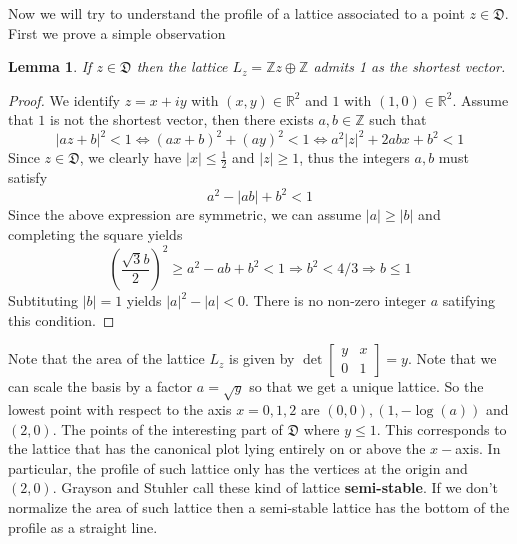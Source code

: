 \documentclass[12pt]{article} %
\newtheorem{lemma}[definition]{Lemma}
\begin{document}
Now we will try to understand the profile of a lattice associated to a point $z \in \mathfrak{D}$. First we
prove a simple observation
\begin{lemma}
  If $z \in \mathfrak{D}$ then the lattice $L_z = \mathbb{Z}z\oplus \mathbb{Z}$ admits 1 as the shortest vector.
\end{lemma}
\begin{proof}
  We identify $z = x+iy$ with $(x,y) \in \mathbb{R}^2$ and $1$ with $(1,0) \in \mathbb{R}^2$.
  Assume that $1$ is not the shortest vector, then there exists $a,b \in \mathbb{Z}$ such that
  \[ |az+b|^2 < 1 \Leftrightarrow (ax+b)^2+(ay)^2 < 1\Leftrightarrow a^2|z|^2+2abx+b^2< 1\]
  Since $z \in \mathfrak{D}$, we clearly have $|x| \le \frac{1}{2}$ and $|z| \ge 1$,  thus the integers $a,b$ must
  satisfy
  \[ a^2 -|ab|+b^2 < 1\]
  Since the above expression are symmetric, we can assume $|a| \ge |b|$ and completing the square yields
  \[\left(\dfrac{\sqrt{3}b}{2}\right)^2 \ge a^2-ab+b^2 <1 \Rightarrow b^2<4/3 \Rightarrow b \le 1\]
  Subtituting $|b|=1$ yields $|a|^2-|a|<0$. There is no non-zero integer $a$ satifying this condition.
\end{proof}
Note that the area of the lattice $L_z$ is given by $\det\begin{bmatrix}
    y & x \\
    0 & 1
  \end{bmatrix} = y$. Note that we can scale the basis by a factor $a=\sqrt{y}$ so that we get a unique lattice.
So the lowest point with respect to the axis $x = 0,1,2$ are $(0,0), (1,-\log(a))$ and $(2,0)$.
The points of the interesting part of $\mathfrak{D}$ where $y\le 1$. This corresponds to the lattice
that has the canonical plot lying entirely on or above the $x-$axis. In particular, the profile of such lattice
only has the vertices at the origin and $(2,0)$. Grayson and Stuhler call these kind of lattice
\textbf{semi-stable}. If we don't normalize the area of such lattice then a semi-stable
lattice has the bottom of the profile as a straight line.
\vspace{\baselineskip}
\end{document}
